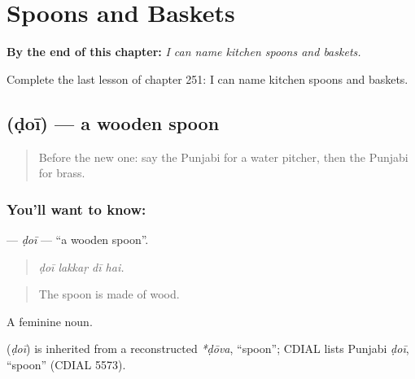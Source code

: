 
\chapter{Spoons and Baskets}
\label{ch:pa-a2-spoons-and-baskets}

\begin{chapteropening}
\textbf{By the end of this chapter:} \emph{I can name kitchen spoons and baskets.}

Complete the last lesson of chapter 251: I can name kitchen spoons and baskets.
\end{chapteropening}

\section[\texorpdfstring{\pa{ਡੋਈ} (ḍoī)}{ਡੋਈ (ḍoī)}]{ (ḍoī) — a wooden spoon}

\label{lesson:PA-C251-doi}



\begin{quote}
Before the new one: say the Punjabi for a water pitcher, then the Punjabi for brass.
\end{quote}

\subsection*{You'll want to know: }
\textbf{} — \emph{ḍoī} — \textquotedblleft{}a wooden spoon\textquotedblright{}.

\begin{quote}
   
\end{quote}

\begin{quote}
\emph{ḍoī lakkaṛ dī hai.}
\end{quote}

\begin{quote}
The spoon is made of wood.
\end{quote}

A feminine noun.

\begin{cousinweb}
\textbf{} (\emph{ḍoī}) is inherited from a reconstructed \emph{*ḍōva}, \textquotedblleft{}spoon\textquotedblright{}; CDIAL lists Punjabi \emph{ḍoī}, \textquotedblleft{}spoon\textquotedblright{} (CDIAL 5573).
\end{cousinweb}

